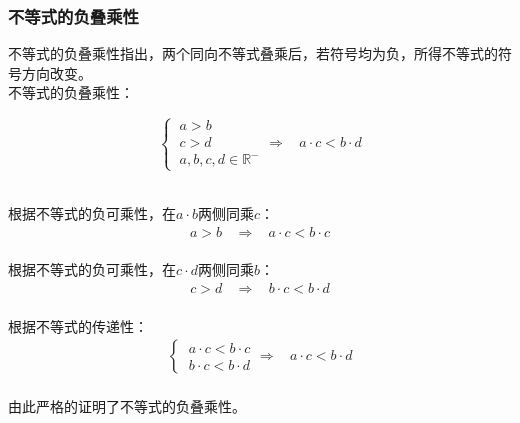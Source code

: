\documentclass[UTF8]{ctexart}
\begin{document}
\subsubsection{不等式的负叠乘性}
    \setcounter{equation}{0}
    不等式的负叠乘性指出，两个同向不等式叠乘后，若符号均为负，所得不等式的符号方向改变。\\[3mm]
    不等式的负叠乘性：\vspace{5pt}
    \begin{large}
        \begin{equation*}
            \begin{cases}
                ~a>b\\[3mm]
                ~c>d\\[3mm]
                ~a,b,c,d\in\mathbb{R^-}
            \end{cases}
            \Longrightarrow~~~~a\cdot c<b\cdot d
        \end{equation*}
    \end{large}\\[3mm]
    根据不等式的负可乘性，在$a\cdot b$两侧同乘$c$：
    \begin{align}
        a>b~~~~\Longrightarrow~~~~a\cdot c<b\cdot c
    \end{align}\\
    根据不等式的负可乘性，在$c\cdot d$两侧同乘$b$：
    \begin{align}
        c>d~~~~\Longrightarrow~~~~b\cdot c<b\cdot d
    \end{align}\\
    根据不等式的传递性：
    \begin{align}
        \begin{cases}
            ~a\cdot c<b\cdot c\\[4mm]
            ~b\cdot c<b\cdot d
        \end{cases}\Longrightarrow~~~~
        a\cdot c<b\cdot d
    \end{align}\\
    由此严格的证明了不等式的负叠乘性。

\newpage
\end{document}
